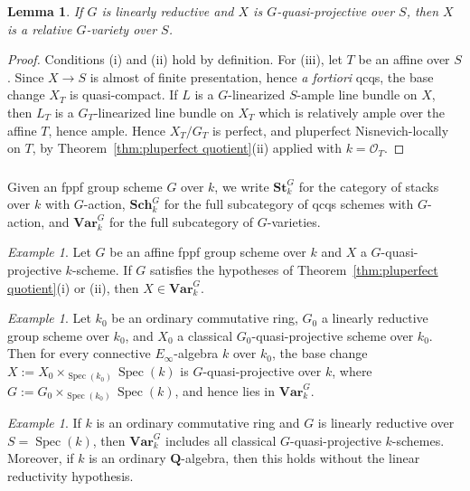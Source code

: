 \documentclass[12pt, oneside]{amsart}
\numberwithin{equation}{section}
\newtheorem{lemma}[subsubsection]{Lemma}
\theoremstyle{remark}
\newtheorem{example}[subsubsection]{Example}
\theoremstyle{plain}
\newcommand{\OO}{\mathcal{O}}
\DeclareMathOperator{\spc}{Spec}
\newcommand{\bQ}{\mathbf{Q}}
\newcommand{\Stk}{\mathbf{St}_{k}}
\newcommand{\Sch}{\mathbf{Sch}_{k}}
\newcommand{\Var}{\mathbf{Var}_{k}}
\begin{document}
\begin{lemma}\label{lem:qproj implies variety}
	If $G$ is linearly reductive and $X$ is $G$-quasi-projective over $S$, then $X$ is a relative $G$-variety over $S$.
\end{lemma}
\begin{proof}
  Conditions (i) and (ii) hold by definition.
  For (iii), let $T$ be an affine over $S$.
  Since $X \to S$ is almost of finite presentation, hence \emph{a fortiori} qcqs, the base change $X_T$ is quasi-compact.
  If $L$ is a $G$-linearized $S$-ample line bundle on $X$, then $L_T$ is a $G_T$-linearized line bundle on $X_T$ which is relatively ample over the affine $T$, hence ample.
  Hence $X_T/G_T$ is perfect, and pluperfect Nisnevich-locally on $T$, by Theorem~\ref{thm:pluperfect quotient}(ii) applied with $k=\OO_T$.
\end{proof}

\subsubsection{}

Given an fppf group scheme $G$ over $k$, we write $\Stk^G$ for the category of stacks over $k$ with $G$-action, $\Sch^G$ for the full subcategory of qcqs schemes with $G$-action, and $\Var^G$ for the full subcategory of $G$-varieties.

\begin{example}\label{ex:VarG}
  Let $G$ be an affine fppf group scheme over $k$ and $X$ a $G$-quasi-projective $k$-scheme.
  If $G$ satisfies the hypotheses of Theorem~\ref{thm:pluperfect quotient}(i) or (ii), then $X \in \Var^G$.
\end{example}

\begin{example}
	Let $k_0$ be an ordinary commutative ring, $G_0$ a linearly reductive group scheme over $k_0$, and $X_0$ a classical $G_0$-quasi-projective scheme over $k_0$.
	Then for every connective $E_\infty$-algebra $k$ over $k_0$, the base change $X := X_0 \times_{\spc(k_0)} \spc(k)$ is $G$-quasi-projective over $k$, where $G := G_0 \times_{\spc(k_0)} \spc(k)$, and hence lies in $\Var^G$.
\end{example}

\begin{example}
	If $k$ is an ordinary commutative ring and $G$ is linearly reductive over $S=\spc(k)$, then $\Var^G$ includes all classical $G$-quasi-projective $k$-schemes.
	Moreover, if $k$ is an ordinary $\bQ$-algebra, then this holds without the linear reductivity hypothesis.
\end{example}
\end{document}
